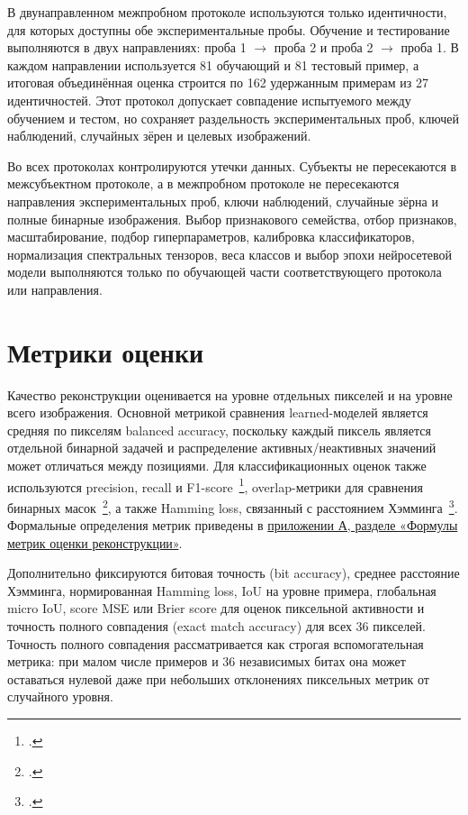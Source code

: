 В двунаправленном межпробном протоколе используются только идентичности, для которых доступны
обе экспериментальные пробы. Обучение и тестирование выполняются в двух направлениях:
проба 1 $\rightarrow$ проба 2 и проба 2 $\rightarrow$ проба 1. В каждом
направлении используется 81 обучающий и 81 тестовый пример, а итоговая
объединённая оценка строится по 162 удержанным примерам из 27 идентичностей.
Этот протокол допускает совпадение испытуемого между обучением и тестом, но
сохраняет раздельность экспериментальных проб, ключей наблюдений, случайных зёрен и целевых
изображений.

Во всех протоколах контролируются утечки данных. Субъекты не пересекаются в
межсубъектном протоколе, а в межпробном протоколе не пересекаются
направления экспериментальных проб, ключи наблюдений, случайные зёрна и полные бинарные
изображения. Выбор признакового
семейства, отбор признаков, масштабирование, подбор гиперпараметров,
калибровка классификаторов, нормализация спектральных тензоров, веса классов и
выбор эпохи нейросетевой модели выполняются только по обучающей части
соответствующего протокола или направления.

\section{Метрики оценки}

Качество реконструкции оценивается на уровне отдельных пикселей и на уровне
всего изображения. Основной метрикой сравнения learned-моделей является средняя
по пикселям balanced accuracy, поскольку каждый пиксель является отдельной
бинарной задачей и распределение активных/неактивных значений может отличаться
между позициями. Для классификационных оценок также используются precision,
recall и F1-score~\footcite{10.1016/j.ipm.2009.03.002}, overlap-метрики для
сравнения бинарных масок~\footcite{10.1186/s12880-015-0068-x}, а также Hamming
loss, связанный с расстоянием Хэмминга~\footcite{10.1002/j.1538-7305.1950.tb00463.x}.
Формальные определения метрик приведены в
\hyperref[app:metrics]{приложении А, разделе «Формулы метрик оценки реконструкции»}.

Дополнительно фиксируются битовая точность (bit accuracy), среднее расстояние
Хэмминга, нормированная Hamming loss, IoU на уровне примера, глобальная micro
IoU, score MSE или Brier score для оценок пиксельной активности и точность
полного совпадения (exact match accuracy) для всех 36 пикселей. Точность
полного совпадения рассматривается как строгая вспомогательная метрика: при
малом числе примеров и 36 независимых битах она может оставаться нулевой даже
при небольших отклонениях пиксельных метрик от случайного уровня.

